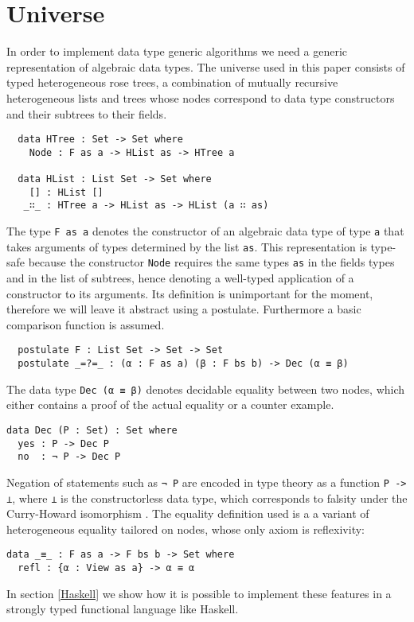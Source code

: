 \documentclass[preprint]{sigplanconf}
\begin{document}
\section{Universe}
In order to implement data type generic algorithms we need a generic representation of algebraic data types.
The universe used in this paper consists of typed heterogeneous rose trees,
a combination of mutually recursive heterogeneous lists and trees
whose nodes correspond to data type constructors and their subtrees
to their fields.
\begin{verbatim}
  data HTree : Set -> Set where
    Node : F as a -> HList as -> HTree a

  data HList : List Set -> Set where
    [] : HList []
   _∷_ : HTree a -> HList as -> HList (a ∷ as)
\end{verbatim}
	The type \texttt{F as a} denotes the constructor of an algebraic data
	type of type \texttt{a} that takes arguments of types determined by the list 
	\texttt{as}. This representation is type-safe because the constructor
	\texttt{Node} requires the same types \texttt{as} in the fields types and in 
	the list of subtrees, hence denoting a 	well-typed application of a 
	constructor to its arguments.
	Its definition is unimportant for the moment, therefore we will leave it
	abstract using a postulate. Furthermore a basic comparison
	function is assumed.
\begin{verbatim}
  postulate F : List Set -> Set -> Set 
  postulate _=?=_ : (α : F as a) (β : F bs b) -> Dec (α ≡ β)
\end{verbatim}	
	The data type \texttt{Dec (α ≡ β)} denotes decidable equality between
	two nodes, which either contains a proof of the actual equality
	or a counter example.
\begin{verbatim}
data Dec (P : Set) : Set where
  yes : P -> Dec P
  no  : ¬ P -> Dec P
\end{verbatim}
	Negation of statements such as \texttt{¬ P} are encoded in type theory as
	a function \texttt{P -> ⊥}, where \texttt{⊥} is
	the constructorless data type, which corresponds to falsity 
	under the Curry-Howard isomorphism \cite{PropositionAsTypes}.
	The equality definition used is a a variant of heterogeneous equality
	tailored on nodes, whose only axiom is reflexivity:
\begin{verbatim}
data _≡_ : F as a -> F bs b -> Set where
  refl : {α : View as a} -> α ≡ α
\end{verbatim}

	In section \ref{Haskell} we show how it is possible to implement these 
	features in a strongly typed functional language like Haskell.
	
\end{document}
